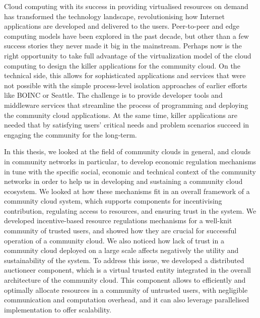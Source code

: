 

Cloud computing with its success in providing virtualised resources on demand has transformed the technology landscape, revolutionising how Internet applications are developed and delivered to the users.
Peer-to-peer and edge computing models have been explored in the past decade, but other than a few success stories they never made it big in the mainstream.
Perhaps now is the right opportunity to take full advantage of the virtualization model of the cloud computing to design the killer applications for the community cloud.
On the technical side, this allows for sophisticated applications and services that were not possible with the simple process-level isolation approaches of earlier efforts like BOINC or Seattle.
The challenge is to provide developer tools and middleware services that streamline the process of programming and deploying the community cloud applications.
At the same time, killer applications are needed that by satisfying users' critical needs and problem scenarios succeed in engaging the community for the long-term.

In this thesis, we looked at the field of community clouds in general, 
and clouds in community networks in particular,
to develop economic regulation mechanisms in tune with 
the specific social, economic and technical context of the community networks
in order to help us in developing and sustaining a community cloud ecosystem.
We looked at how these mechanisms fit in an overall framework of a community cloud system,
which supports components for 
	incentivising contribution, 
	regulating access to resources, 
	and ensuring trust in the system.
We developed incentive-based resource regulations mechanisms for a well-knit community of trusted users,
and showed how they are crucial for successful operation of a community cloud.
We also noticed how lack of trust in a community cloud deployed on a large scale affects negatively the utility and sustainability of the system.
To address this issue, we developed a distributed auctioneer component, 
which is a virtual trusted entity integrated in the overall architecture of the community cloud.
This component allows to efficiently and optimally allocate resources in a community of untrusted users,
with negligible communication and computation overhead, 
and it can also leverage parallelised implementation to offer scalability.
